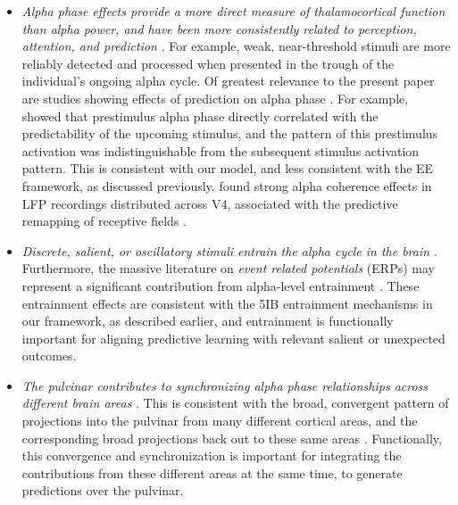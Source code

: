 \documentclass[11pt,twoside]{article}
\newif\myifpdf
\begin{document}
\begin{itemize}
	\item \emph{Alpha phase effects provide a more direct measure of thalamocortical function than alpha power, and have been more consistently related to perception, attention, and prediction}  \citep{NunnOsselton74,VarelaToroJohnEtAl81,VanRullenKoch03,BuschDuboisVanRullen09,MathewsonFabianiGrattonEtAl10,PalvaPalva11,JaegleRo13,NeupaneGuittonPack17,Solis-VivancoJensenBonnefond18}.  For example, weak, near-threshold stimuli are more reliably detected and processed when presented in the trough of the individual's ongoing alpha cycle.  Of greatest relevance to the present paper are studies showing effects of prediction on alpha phase \citep{SamahaBauerCimaroliEtAl15,MayerSchwiedrzikWibralEtAl16,ShermanKanaiSethEtAl16}.  For example, \citet{MayerSchwiedrzikWibralEtAl16} showed that prestimulus alpha phase directly correlated with the predictability of the upcoming stimulus, and the pattern of this prestimulus activation was indistinguishable from the subsequent stimulus activation pattern.  This is consistent with our model, and less consistent with the EE framework, as discussed previously.  \citet{NeupaneGuittonPack17} found strong alpha coherence effects in LFP recordings distributed across V4, associated with the predictive remapping of receptive fields \citep{DuhamelColbyGoldberg92}.

	\item \emph{Discrete, salient, or oscillatory stimuli entrain the alpha cycle in the brain} \citep{SpaakLangeJensen14,MathewsonPrudhommeFabianiEtAl12}.  Furthermore, the massive literature on \emph{event related potentials} (ERPs) may represent a significant contribution from alpha-level entrainment \citep{MakeigWesterfieldJungEtAl02,GruberKlimeschSausengEtAl05,Klimesch11}.  These entrainment effects are consistent with the 5IB entrainment mechanisms in our framework, as described earlier, and entrainment is functionally important for aligning predictive learning with relevant salient or unexpected outcomes.

	\item \emph{The pulvinar contributes to synchronizing alpha phase relationships across different brain areas} \citep{SaalmannPinskWangEtAl12,FiebelkornPinskKastner18}.  This is consistent with the broad, convergent pattern of projections into the pulvinar from many different cortical areas, and the corresponding broad projections back out to these same areas \citep{Shipp03,ArcaroPinskKastner15}.  Functionally, this convergence and synchronization is important for integrating the contributions from these different areas at the same time, to generate predictions over the pulvinar.
	

\end{itemize}
\end{document}
